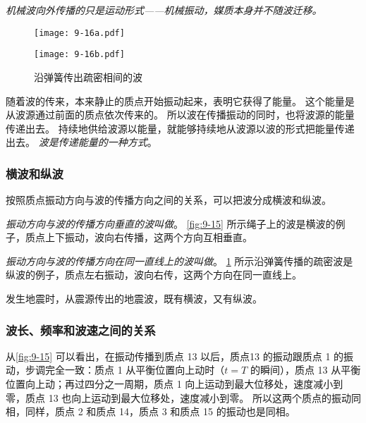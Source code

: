\emph{机械波向外传播的只是运动形式——机械振动，媒质本身并不随波迁移。}

\begin{figure}
  \begin{minipage}{0.1\linewidth}
    \subcaption{}\label{fig:9-16a}
  \end{minipage}%
  \begin{minipage}{0.9\linewidth}
    \texttt{[image: 9-16a.pdf]}
  \end{minipage}
  \par\medskip
  \begin{minipage}{0.1\linewidth}
    \subcaption{}\label{fig:9-16b}
  \end{minipage}%
  \begin{minipage}{0.9\linewidth}
    \texttt{[image: 9-16b.pdf]}
  \end{minipage}
  \caption{沿弹簧传出疏密相间的波}\label{fig:9-16}
\end{figure}

随着波的传来，本来静止的质点开始振动起来，表明它获得了能量。
这个能量是从波源通过前面的质点依次传来的。
所以波在传播振动的同时，也将波源的能量传递出去。
持续地供给波源以能量，就能够持续地从波源以波的形式把能量传递出去。
\emph{波是传递能量的一种方式}。

\subsubsection{横波和纵波} 
按照质点振动方向与波的传播方向之间的关系，可以把波分成横波和纵波。

\emph{振动方向与波的传播方向垂直的波叫做}。
\cref{fig:9-15} 所示绳子上的波是横波的例子，质点上下振动，波向右传播，这两个方向互相垂直。

\emph{振动方向与波的传播方向在同一直线上的波叫做}。
\cref{fig:9-16} 所示沿弹簧传播的疏密波是纵波的例子，质点左右振动，波向右传，这两个方向在同一直线上。

发生地震时，从震源传出的地震波，既有横波，又有纵波。

\subsubsection{波长、频率和波速之间的关系}

从\cref{fig:9-15} 可以看出，在振动传播到质点 13 以后，质点13 的振动跟质点 1 的振动，步调完全一致：质点 1 从平衡位置向上动时（$t=T$ 的瞬间），质点 13 从平衡位置向上动；再过四分之一周期，质点 1 向上运动到最大位移处，速度减小到零，质点 13 也向上运动到最大位移处，速度减小到零。
所以这两个质点的振动同相，同样，质点 2 和质点 14，质点 3 和质点 15 的振动也是同相。

